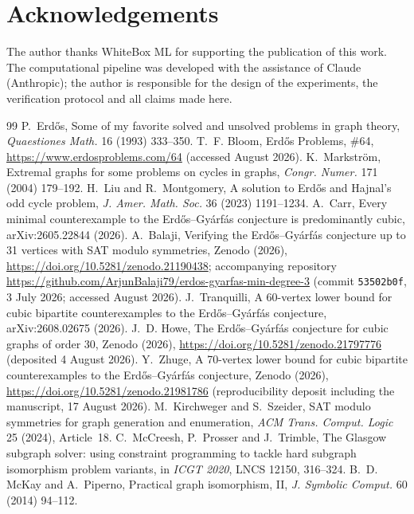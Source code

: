 \documentclass[11pt]{article}
\begin{document}
\section*{Acknowledgements}
The author thanks WhiteBox ML for supporting the publication of this work. The
computational pipeline was developed with the
assistance of Claude (Anthropic); the author is responsible for the design of
the experiments, the verification protocol and all claims made here.

\begin{thebibliography}{99}
 P.~Erd\H{o}s, Some of my favorite solved and unsolved
  problems in graph theory, \emph{Quaestiones Math.} 16 (1993) 333--350.
 T.~F. Bloom, Erd\H{o}s Problems, \#64,
  \url{https://www.erdosproblems.com/64} (accessed August 2026).
 K.~Markstr\"om, Extremal graphs for some problems on
  cycles in graphs, \emph{Congr. Numer.} 171 (2004) 179--192.
 H.~Liu and R.~Montgomery, A solution to Erd\H{o}s and
  Hajnal's odd cycle problem, \emph{J. Amer. Math. Soc.} 36 (2023) 1191--1234.
 A.~Carr, Every minimal counterexample to the
  Erd\H{o}s--Gy\'arf\'as conjecture is predominantly cubic, arXiv:2605.22844
  (2026).
 A.~Balaji, Verifying the Erd\H{o}s--Gy\'arf\'as conjecture
  up to 31 vertices with SAT modulo symmetries, Zenodo (2026),
  \url{https://doi.org/10.5281/zenodo.21190438}; accompanying repository
  \url{https://github.com/ArjunBalaji79/erdos-gyarfas-min-degree-3}
  (commit \texttt{53502b0f}, 3 July 2026; accessed August 2026).
 J.~Tranquilli, A 60-vertex lower bound for cubic
  bipartite counterexamples to the Erd\H{o}s--Gy\'arf\'as conjecture,
  arXiv:2608.02675 (2026).
 J.~D. Howe, The Erd\H{o}s--Gy\'arf\'as conjecture for cubic
  graphs of order 30, Zenodo (2026),
  \url{https://doi.org/10.5281/zenodo.21797776} (deposited 4 August 2026).
 Y.~Zhuge, A 70-vertex lower bound for cubic bipartite
  counterexamples to the Erd\H{o}s--Gy\'arf\'as conjecture, Zenodo (2026),
  \url{https://doi.org/10.5281/zenodo.21981786} (reproducibility deposit
  including the manuscript, 17 August 2026).
 M.~Kirchweger and S.~Szeider, SAT modulo symmetries for graph
  generation and enumeration, \emph{ACM Trans. Comput. Logic} 25 (2024),
  Article~18.
 C.~McCreesh, P.~Prosser and J.~Trimble, The Glasgow subgraph
  solver: using constraint programming to tackle hard subgraph isomorphism
  problem variants, in \emph{ICGT 2020}, LNCS 12150, 316--324.
 B.~D. McKay and A.~Piperno, Practical graph isomorphism, II,
  \emph{J. Symbolic Comput.} 60 (2014) 94--112.
\end{thebibliography}
\end{document}
